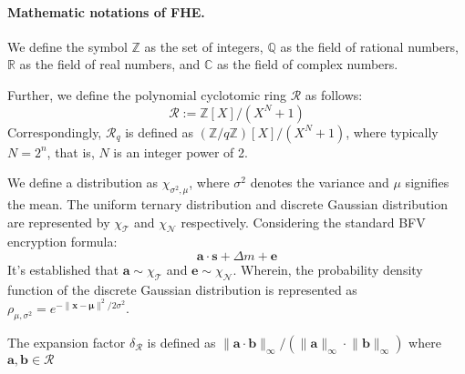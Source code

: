 \documentclass[11pt]{article}
\begin{document}
\paragraph{Mathematic notations of FHE.}
We define the symbol $\mathbb{Z}$ as the set of integers, $\mathbb{Q}$ as the field of rational numbers, $\mathbb{R}$ as the field of real numbers, and $\mathbb{C}$ as the field of complex numbers.

Further, we define the polynomial cyclotomic ring $\mathcal{R}$ as follows: $$\mathcal{R}:=\mathbb{Z}[X]/(X^N+1)$$ Correspondingly, $\mathcal{R}_q$ is defined as $(\mathbb{Z}/q\mathbb{Z})[X]/(X^N+1)$, where typically $N=2^n$, that is, $N$ is an integer power of 2.

We define a distribution as $\chi_{\sigma^2,\mu}$, where $\sigma^2$ denotes the variance and $\mu$ signifies the mean. The uniform ternary distribution and discrete Gaussian distribution are represented by $\chi_\mathcal{T}$ and $\chi_\mathcal{N}$ respectively. Considering the standard BFV encryption formula: $$\mathbf{a}\cdot \mathbf{s} +\Delta m +\mathbf{e}$$
It's established that $\mathbf{a}\sim\chi_\mathcal{T}$ and $\mathbf{e}\sim\chi_{\mathcal{N}}$.
Wherein, the probability density function of the discrete Gaussian distribution is represented as $\rho_{\mu,\sigma^2}=e^{-\lVert\mathbf{x}-\mathbf{\mu}\rVert^2/2\sigma^2}$.

The expansion factor $\delta_\mathcal{R}$ is defined as $\lVert \mathbf{a}\cdot\mathbf{b}\rVert_\infty/(\lVert\mathbf{a}\rVert_\infty\cdot\lVert\mathbf{b}\rVert_\infty)$ where $\mathbf{a},\mathbf{b}\in \mathcal{R}$
\end{document}
